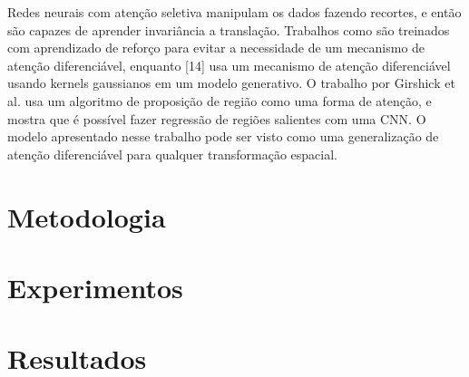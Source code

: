 \documentclass[conference]{IEEEtran}
\begin{document}
Redes neurais com atenção seletiva manipulam os dados fazendo recortes, e então são capazes de aprender invariância a translação. Trabalhos como \cite{ba2014multiple,sermanet2014attention} são treinados com aprendizado de reforço para evitar a necessidade de um mecanismo de atenção diferenciável, enquanto [14] usa um mecanismo de atenção diferenciável usando kernels gaussianos em um modelo generativo. O trabalho por Girshick et al. \cite{girshick2014rich} usa um algoritmo de proposição de região como uma forma de atenção, e \cite{erhan2014scalable} mostra que é possível fazer regressão de regiões salientes com uma CNN. O modelo apresentado nesse trabalho pode ser visto como uma generalização de atenção diferenciável para qualquer transformação espacial.

\section{Metodologia}


\section{Experimentos}


\section{Resultados}





%
%
%






\end{document}
